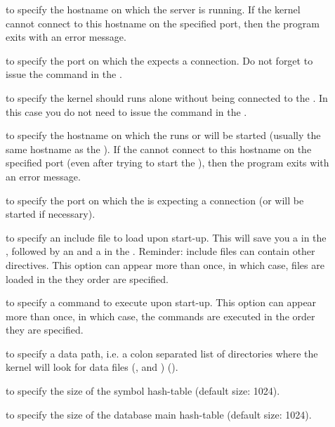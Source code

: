 \begin{description}

\item[] to specify the hostname on which the server is running.  If
the kernel cannot connect to this hostname on the specified port, then the
program exits with an error message.

\item[] to specify the port on which the \OPRSS{} expects a
connection. Do not forget to issue the  command in the
\OPRSS{}.

\item[] to specify the kernel should runs alone without being
connected to the \OPRSS{}. In this case you do not need to issue the
 command in the \OPRSS{}.

\item[] to specify the hostname on which the \MP{} runs or will be
started (usually the same hostname as the \OPRSS{}). If the \CPK{}
cannot connect to this hostname on the specified port (even after trying to
start the \MP{}), then the program exits with an error message.

\item[] to specify the port on which the \MP{} is expecting a
connection (or will be started if necessary).

\item[] to specify an include file to load upon start-up. This will
  save you a  in the \OPRSS{}, followed by an 
  and a  in the \CPK{}. Reminder: include files can contain
  other  directives. This option can appear more than once, in
  which case, files are loaded in the they order are specified.
  
\item[] to specify a command to execute upon start-up. This option
  can appear more than once, in which case, the commands are executed in the
  order they are specified.

\item[] to specify a data path, i.e. a colon separated list of
directories where the kernel will look for data files (,
 and ) ().

\item[] to specify the size of the symbol hash-table (default size:
1024).

\item[] to specify the size of the database main hash-table
(default size: 1024).


\end{description}
